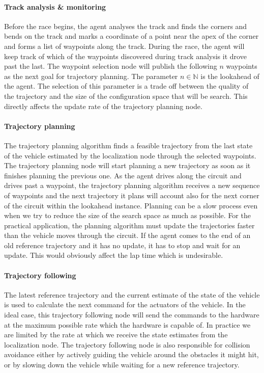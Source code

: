 \paragraph{Track analysis \& monitoring} Before the race begins, the agent analyses the track and finds the corners and bends on the track and marks a coordinate of a point near the apex of the corner and forms a list of waypoints along the track. During the race, the agent will keep track of which of the waypoints discovered during track analysis it drove past the last. The waypoint selection node will publish the following $n$ waypoints as the next goal for trajectory planning. The parameter $n\in\mathbb{N}$ is the lookahead of the agent. The selection of this parameter is a trade off between the quality of the trajectory and the size of the configuration space that will be search. This directly affects the update rate of the trajectory planning node.

\paragraph{Trajectory planning} The trajectory planning algorithm finds a feasible trajectory from the last state of the vehicle estimated by the localization node through the selected waypoints. The trajectory planning node will start planning a new trajectory as soon as it finishes planning the previous one. As the agent drives along the circuit and drives past a waypoint, the trajectory planning algorithm receives a new sequence of waypoints and the next trajectory it plans will account also for the next corner of the circuit within the lookahead instance. Planning can be a slow process even when we try to reduce the size of the search space as much as possible. For the practical application, the planning algorithm must update the trajectories faster than the vehicle moves through the circuit. If the agent comes to the end of an old reference trajectory and it has no update, it has to stop and wait for an update. This would obviously affect the lap time which is undesirable.

\paragraph{Trajectory following} The latest reference trajectory and the current estimate of the state of the vehicle is used to calculate the next command for the actuators of the vehicle. In the ideal case, this trajectory following node will send the commands to the hardware at the maximum possible rate which the hardware is capable of. In practice we are limited by the rate at which we receive the state estimates from the localization node. The trajectory following node is also responsible for collision avoidance either by actively guiding the vehicle around the obstacles it might hit, or by slowing down the vehicle while waiting for a new reference trajectory.

